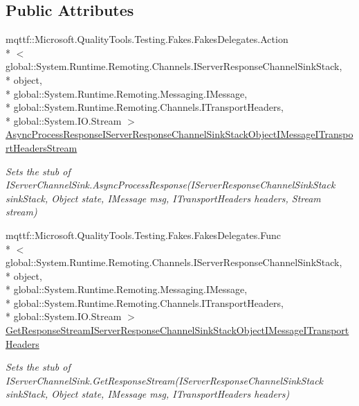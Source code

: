 \subsection*{Public Attributes}
\begin{DoxyCompactItemize}
\item 
mqttf\-::\-Microsoft.\-Quality\-Tools.\-Testing.\-Fakes.\-Fakes\-Delegates.\-Action\\*
$<$ global\-::\-System.\-Runtime.\-Remoting.\-Channels.\-I\-Server\-Response\-Channel\-Sink\-Stack, \\*
object, \\*
global\-::\-System.\-Runtime.\-Remoting.\-Messaging.\-I\-Message, \\*
global\-::\-System.\-Runtime.\-Remoting.\-Channels.\-I\-Transport\-Headers, \\*
global\-::\-System.\-I\-O.\-Stream $>$ \hyperlink{class_system_1_1_runtime_1_1_remoting_1_1_channels_1_1_fakes_1_1_stub_i_server_channel_sink_a08c066b78c801f475499fc94476a4e5e}{Async\-Process\-Response\-I\-Server\-Response\-Channel\-Sink\-Stack\-Object\-I\-Message\-I\-Transport\-Headers\-Stream}
\begin{DoxyCompactList}\small\item\em Sets the stub of I\-Server\-Channel\-Sink.\-Async\-Process\-Response(\-I\-Server\-Response\-Channel\-Sink\-Stack sink\-Stack, Object state, I\-Message msg, I\-Transport\-Headers headers, Stream stream)\end{DoxyCompactList}\item 
mqttf\-::\-Microsoft.\-Quality\-Tools.\-Testing.\-Fakes.\-Fakes\-Delegates.\-Func\\*
$<$ global\-::\-System.\-Runtime.\-Remoting.\-Channels.\-I\-Server\-Response\-Channel\-Sink\-Stack, \\*
object, \\*
global\-::\-System.\-Runtime.\-Remoting.\-Messaging.\-I\-Message, \\*
global\-::\-System.\-Runtime.\-Remoting.\-Channels.\-I\-Transport\-Headers, \\*
global\-::\-System.\-I\-O.\-Stream $>$ \hyperlink{class_system_1_1_runtime_1_1_remoting_1_1_channels_1_1_fakes_1_1_stub_i_server_channel_sink_ae05e1ee9f8ad56bd54d3760a17930b27}{Get\-Response\-Stream\-I\-Server\-Response\-Channel\-Sink\-Stack\-Object\-I\-Message\-I\-Transport\-Headers}
\begin{DoxyCompactList}\small\item\em Sets the stub of I\-Server\-Channel\-Sink.\-Get\-Response\-Stream(\-I\-Server\-Response\-Channel\-Sink\-Stack sink\-Stack, Object state, I\-Message msg, I\-Transport\-Headers headers)\end{DoxyCompactList}\item 

\end{DoxyCompactItemize}
